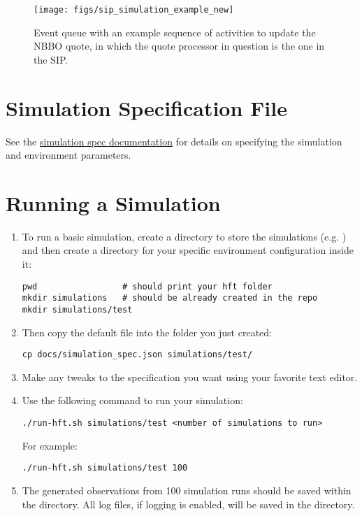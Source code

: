 \documentclass[11pt]{article}
\begin{document}
\begin{figure}
\texttt{[image: figs/sip\_simulation\_example\_new]}
\caption{Event queue with an example sequence of activities to update the NBBO quote, in which the quote processor in question is the one in the SIP.}
\label{fig:sim-sys}
\end{figure}

\section{Simulation Specification File}

See the \href{../simulation_spec.pdf}{simulation spec documentation} for details on specifying the simulation and environment parameters.

\section{Running a Simulation}

\begin{enumerate}
\item To run a basic simulation, create a directory to store the
  simulations (e.g. ) and then create a directory for your
  specific environment configuration inside it:
%
\begin{verbatim}
pwd                 # should print your hft folder
mkdir simulations   # should be already created in the repo
mkdir simulations/test
\end{verbatim}

\item Then copy the default  file into the folder you just created:
%
\begin{verbatim}
cp docs/simulation_spec.json simulations/test/
\end{verbatim}

\item Make any tweaks to the specification you want using your favorite text editor.

\item Use the following command to run your simulation:
%
\begin{verbatim}
./run-hft.sh simulations/test <number of simulations to run>
\end{verbatim}

For example:
\begin{verbatim}
./run-hft.sh simulations/test 100
\end{verbatim}

\item The generated observations from 100 simulation runs should be saved within the  directory. All log files, if logging is enabled, will be saved in the  directory.

\end{enumerate}
\end{document}
